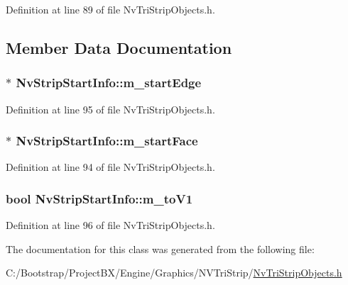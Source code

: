 Definition at line 89 of file NvTriStripObjects.h.

\subsection{Member Data Documentation}
\hypertarget{class_nv_strip_start_info_79992beb7f2b518f57db8cc9460ff696}{
\subsubsection[{m\_\-startEdge}]{$\ast$ {\bf NvStripStartInfo::m\_\-startEdge}}}
\label{class_nv_strip_start_info_79992beb7f2b518f57db8cc9460ff696}




Definition at line 95 of file NvTriStripObjects.h.\hypertarget{class_nv_strip_start_info_f25b559930abc57ccaff9e726d2b21c9}{
\subsubsection[{m\_\-startFace}]{$\ast$ {\bf NvStripStartInfo::m\_\-startFace}}}
\label{class_nv_strip_start_info_f25b559930abc57ccaff9e726d2b21c9}




Definition at line 94 of file NvTriStripObjects.h.\hypertarget{class_nv_strip_start_info_c784b08380d565a14a7290832dfc3af3}{
\subsubsection[{m\_\-toV1}]{\setlength{\rightskip}{0pt plus 5cm}bool {\bf NvStripStartInfo::m\_\-toV1}}}
\label{class_nv_strip_start_info_c784b08380d565a14a7290832dfc3af3}




Definition at line 96 of file NvTriStripObjects.h.

The documentation for this class was generated from the following file:\begin{CompactItemize}
\item 
C:/Bootstrap/ProjectBX/Engine/Graphics/NVTriStrip/\hyperlink{_nv_tri_strip_objects_8h}{NvTriStripObjects.h}\end{CompactItemize}
